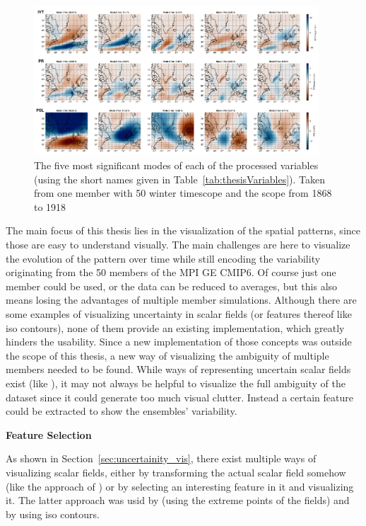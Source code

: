 \begin{figure}[htb]
  \begin{center}
    \includegraphics[width=0.95\textwidth]{figures/top5_spatial_modes_ivt_psl_pr_mem11_scope20.png}
\end{center}
  \caption{The five most significant modes of each of the processed variables (using the short names given in Table~\ref{tab:thesisVariables}). Taken from one member with 50 winter timescope and the scope from 1868 to 1918}
  \label{fig:5modes each variable}
\end{figure}


The main focus of this thesis lies in the visualization of the spatial patterns, since those are easy to understand visually.  
The main challenges are here to visualize the evolution of the pattern over time while still encoding the variability originating from the 50 members of the MPI GE CMIP6. 
Of course just one member could be used, or the data can be reduced to averages, but this also means losing the advantages of multiple member simulations. 
Although there are some examples of visualizing uncertainty in scalar fields (or features thereof like iso contours), none of them provide an existing implementation, which greatly hinders the usability. 
Since a new implementation of those concepts was outside the scope of this thesis, a new way of visualizing the ambiguity of multiple members needed to be found. 
While ways of representing uncertain scalar fields exist (like \cite{coninx_visualization_2011}), it may not always be helpful to visualize the full ambiguity of the dataset since it could generate too much visual clutter. 
Instead a certain feature could be extracted to show the ensembles' variability.

\textbf{Feature Selection}

As shown in Section~\ref{sec:uncertainity_vis}, there exist multiple ways of visualizing scalar fields, either by transforming the actual scalar field somehow (like the approach of ) or by selecting an interesting feature in it and visualizing it. 
The latter approach was usid by   (using the extreme points of the fields) and by \cite{sanyal_noodles_2010, whitaker_contour_2013} using iso contours.  

